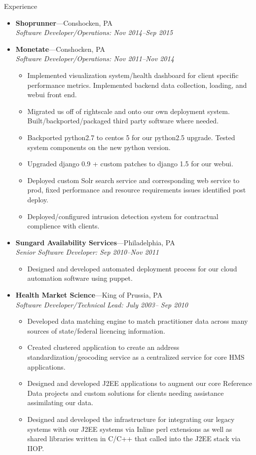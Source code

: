 \documentclass[11pt,oneside]{article}
\newenvironment{ressection}[1]{
        \vspace{4pt}
        {\fontfamily{phv}\selectfont\Large#1}
        \begin{itemize}
        \vspace{3pt}
}{
        \end{itemize}
}
\newcommand{\ressubitem}[1]{
        \vspace{-1pt}
        \item \begin{flushleft} #1 \end{flushleft}
}
\newcommand{\resbigitem}[3]{
        \vspace{-5pt}
        \item
        \textbf{#1}---#2 \\
        \textit{#3}
}
\newenvironment{ressubsec}[3]{
        \resbigitem{#1}{#2}{#3}
        \vspace{-2pt}
        \begin{itemize}
}{
        \end{itemize}
}
\begin{document}
\begin{ressection}{Experience}
\begin{ressubsec}{Shoprunner}{Conshocken, PA}{Software Developer/Operations: Nov 2014--Sep 2015}
        \end{ressubsec}
        

        
        \begin{ressubsec}{Monetate}{Conshocken, PA}{Software Developer/Operations: Nov 2011--Nov 2014}

          \ressubitem{Implemented visualization system/health dashboard for client specific performance metrics. Implemented backend data collection, loading, and webui front end. }
          \ressubitem{Migrated us off of rightscale and onto our own deployment system. Built/backported/packaged third party software where needed. }
          \ressubitem{Backported python2.7 to centos 5 for our python2.5 upgrade. Tested system components on the new python version.}
          \ressubitem{Upgraded django 0.9 + custom patches to django 1.5 for our webui.}
          \ressubitem{Deployed custom Solr search service and corresponding web service to prod, fixed performance and resource requirements issues identified post deploy.}
          \ressubitem{Deployed/configured intrusion detection system for contractual complience with clients. }
        \end{ressubsec}


        \begin{ressubsec}{Sungard Availability Services}{Philadelphia, PA}{Senior Software Developer: Sep 2010--Nov 2011}

          \ressubitem{Designed and developed automated deployment process for our cloud automation software using puppet. }
        \end{ressubsec}

        \begin{ressubsec}{Health Market Science}{King of Prussia, PA}{Software Developer/Technical Lead: July 2003-- Sep 2010}

          \ressubitem{Developed data matching engine to match practitioner data across many sources of state/federal licencing information.}

          \ressubitem{Created clustered application to create an
            address standardization/geocoding service as a centralized
            service for core HMS applications.}
          \ressubitem{Designed and developed J2EE applications to
            augment our core Reference Data projects and custom
            solutions for clients needing assistance assimilating our
            data.}

          \ressubitem{Designed and developed the infrastructure for
            integrating our legacy systems with our J2EE systems via
            Inline perl extensions as well as shared libraries written
            in C/C++ that called into the J2EE stack via IIOP.}


\end{ressubsec}
\end{ressection}
\end{document}
